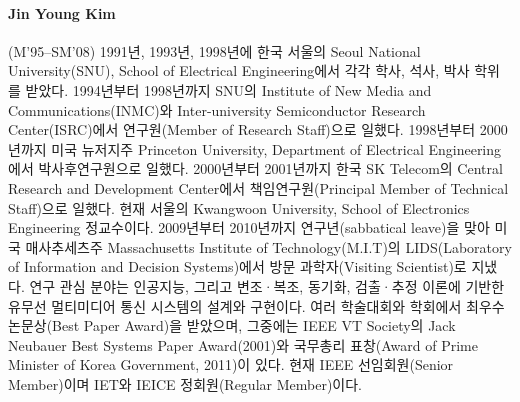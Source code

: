 \paragraph{Jin Young Kim} (M'95--SM'08)
1991년, 1993년, 1998년에 한국 서울의 Seoul National University(SNU), School of Electrical Engineering에서 각각 학사, 석사, 박사 학위를 받았다.
1994년부터 1998년까지 SNU의 Institute of New Media and Communications(INMC)와 Inter-university Semiconductor Research Center(ISRC)에서 연구원(Member of Research Staff)으로 일했다.
1998년부터 2000년까지 미국 뉴저지주 Princeton University, Department of Electrical Engineering에서 박사후연구원으로 일했다.
2000년부터 2001년까지 한국 SK Telecom의 Central Research and Development Center에서 책임연구원(Principal Member of Technical Staff)으로 일했다.
현재 서울의 Kwangwoon University, School of Electronics Engineering 정교수이다.
2009년부터 2010년까지 연구년(sabbatical leave)을 맞아 미국 매사추세츠주 Massachusetts Institute of Technology(M.I.T)의 LIDS(Laboratory of Information and Decision Systems)에서 방문 과학자(Visiting Scientist)로 지냈다.
연구 관심 분야는 인공지능, 그리고 변조·복조, 동기화, 검출·추정 이론에 기반한 유무선 멀티미디어 통신 시스템의 설계와 구현이다.
여러 학술대회와 학회에서 최우수 논문상(Best Paper Award)을 받았으며, 그중에는 IEEE VT Society의 Jack Neubauer Best Systems Paper Award(2001)와 국무총리 표창(Award of Prime Minister of Korea Government, 2011)이 있다.
현재 IEEE 선임회원(Senior Member)이며 IET와 IEICE 정회원(Regular Member)이다.
